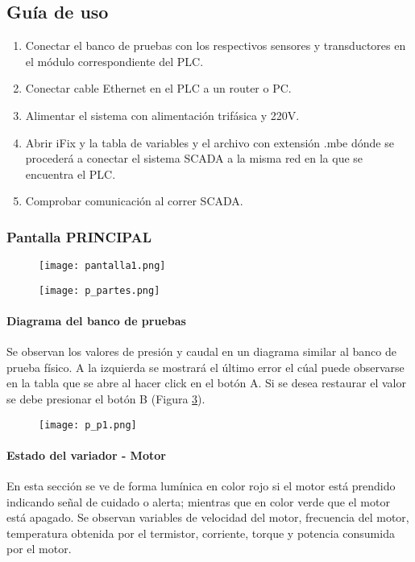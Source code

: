 \subsection{Guía de uso}
\begin{enumerate}
	\item Conectar el banco de pruebas con los respectivos sensores y transductores en el módulo correspondiente del PLC.
	\item Conectar cable Ethernet en el PLC a un router o PC.
	\item Alimentar el sistema con alimentación trifásica y 220V.
	\item Abrir iFix y la tabla de variables y el archivo con extensión .mbe dónde se procederá a conectar el sistema SCADA a la misma red en la que se encuentra el PLC.
	\item Comprobar comunicación al correr SCADA.
\end{enumerate}

\subsubsection{Pantalla PRINCIPAL}

\begin{figure}[h!]
	\centering
	\texttt{[image: pantalla1.png]}
	\label{fig:pantalla1}
\end{figure}
\begin{figure}[h!]
	\centering
	\texttt{[image: p\_partes.png]}
	\label{fig:partes}
\end{figure}

\paragraph{Diagrama del banco de pruebas}
Se observan los valores de presión y caudal en un diagrama similar al banco de prueba físico. A la izquierda se mostrará el último error el cúal puede observarse en la tabla que se abre al hacer click en el botón A. Si se desea restaurar el valor se debe presionar el botón B (Figura \ref{fig:pp1}).
\begin{figure}[h!]
	\centering
	\texttt{[image: p\_p1.png]}
	\label{fig:pp1}
\end{figure}

\paragraph{Estado del variador - Motor}
En esta sección se ve de forma lumínica en color rojo si el motor está prendido indicando señal de cuidado o alerta; mientras que en color verde que el motor está apagado. Se observan variables de velocidad del motor, frecuencia del motor, temperatura obtenida por el termistor, corriente, torque y potencia consumida por el motor.

